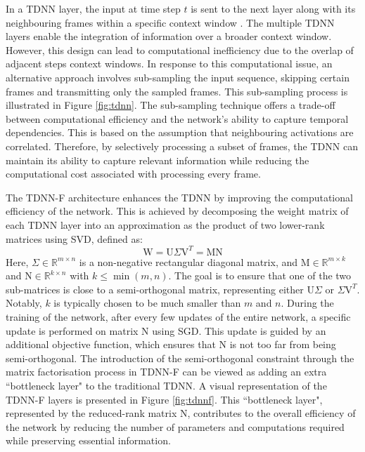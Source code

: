 In a \ac{TDNN} layer, the input at time step $t$ is sent to the next layer along with its neighbouring frames within a specific context window \cite{tdnn}. The multiple  \ac{TDNN} layers enable the integration of information over a broader context window. However, this design can lead to computational inefficiency due to the overlap of adjacent steps context windows. In response to this computational issue, an alternative approach involves sub-sampling the input sequence, skipping certain frames and transmitting only the sampled frames. This sub-sampling process is illustrated in Figure \ref{fig:tdnn}. 
The sub-sampling technique offers a trade-off between computational efficiency and the network's ability to capture temporal dependencies. This is based on the assumption that neighbouring activations are correlated. Therefore, by selectively processing a subset of frames, the TDNN can maintain its ability to capture relevant information while reducing the computational cost associated with processing every frame.

The \ac{TDNN-F} architecture \cite{TDNN-F} enhances the \ac{TDNN} by improving the computational efficiency of the network. This is achieved by decomposing the weight matrix of each \ac{TDNN} layer into an approximation as the product of two lower-rank matrices using \ac{SVD}, defined as:
\begin{equation}
    \text{W} = \text{U}\Sigma \text{V}^T = \text{MN}
\end{equation}
Here, $\Sigma \in \mathbb{R}^{m \times n}$ is a non-negative rectangular diagonal matrix, and $\text{M} \in \mathbb{R}^{m \times k}$ and $\text{N} \in \mathbb{R}^{k \times n}$ with $k \leq \min(m,n)$. The goal is to ensure that one of the two sub-matrices is close to a semi-orthogonal matrix, representing either $\text{U}\Sigma$ or $\Sigma \text{V}^T$. Notably, $k$ is typically chosen to be much smaller than $m$ and $n$.
During the training of the network, after every few updates of the entire network, a specific update is performed on matrix $\text{N}$ using \ac{SGD}. This update is guided by an additional objective function, which ensures that $\text{N}$ is not too far from being semi-orthogonal.
The introduction of the semi-orthogonal constraint through the matrix factorisation process in \ac{TDNN-F} can be viewed as adding an extra ``bottleneck layer" to the traditional \ac{TDNN}. A visual representation of the \ac{TDNN-F} layers is presented in Figure \ref{fig:tdnnf}. This ``bottleneck layer", represented by the reduced-rank matrix $\text{N}$, contributes to the overall efficiency of the network by reducing the number of parameters and computations required while preserving essential information.

